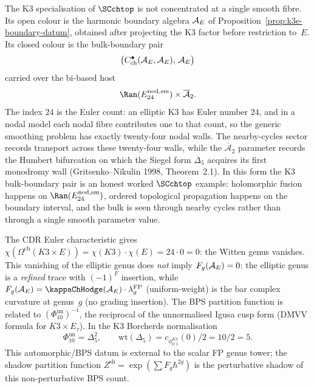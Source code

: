 \begin{example}
\label{ex:k3e-scchtop-bulk-boundary}
The K3 specialisation of $\SCchtop$ is not concentrated at a single
smooth fibre. Its open colour is the harmonic boundary algebra
$\mathcal{A}_E$ of Proposition~\ref{prop:k3e-boundary-datum}, obtained after
projecting the K3 factor before restriction to~$E$. Its closed colour
is the bulk-boundary pair
\[
 \bigl(C^\bullet_{\mathrm{ch}}(\mathcal{A}_E,\mathcal{A}_E),\, \mathcal{A}_E\bigr)
\]
carried over the bi-based host
\[
 \Ran(E^{\mathrm{nod,sm}}_{24}) \times \overline{\mathcal{A}}_2.
\]
The index $24$ is the Euler count: an elliptic K3 has Euler number
$24$, and in a nodal model each nodal fibre contributes one to that
count, so the generic smoothing problem has exactly twenty-four nodal
walls. The nearby-cycles sector records transport
across these twenty-four walls, while the $\overline{\mathcal{A}}_2$
parameter records the Humbert bifurcation on which the Siegel form
$\Delta_5$ acquires its first monodromy wall
\textup{(}Gritsenko--Nikulin 1998, Theorem~2.1\textup{)}. In this form
the K3 bulk-boundary pair is an honest worked $\SCchtop$ example:
holomorphic fusion happens on $\Ran(E^{\mathrm{nod,sm}}_{24})$, ordered
topological propagation happens on the boundary interval, and the bulk
is seen through nearby cycles rather than through a single smooth
parameter value.
\end{example}

\begin{remark}
\label{rem:k3e-factorization-homology}
The CDR Euler characteristic gives
$\chi(\Omega^{\mathrm{ch}}(K3 \times E)) = \chi(K3) \cdot \chi(E)
= 24 \cdot 0 = 0$: the Witten genus vanishes. This
vanishing of the elliptic genus does \emph{not} imply
$F_g(\mathcal{A}_E) = 0$: the elliptic genus is a
\emph{refined} trace with $(-1)^F$ insertion, while
$F_g(\cA_E) = \kappaChHodge(\cA_E) \cdot \lambda_g^{\mathrm{FP}}$
\textup{(}uniform-weight\textup{)} is the bar complex
curvature at genus~$g$ (no grading insertion). The BPS partition
function is related to $(\Phi_{10}^{\mathrm{un}})^{-1}$, the reciprocal
of the unnormalised Igusa cusp form (DMVV formula for
$K3 \times E_\tau$). In the K3 Borcherds normalisation
\[
 \Phi_{10}^{\mathrm{un}}=\Delta_5^2,\qquad
 \mathrm{wt}(\Delta_5)=c_{\phi_{0,1}^{K3}}(0)/2=10/2=5 .
\]
This automorphic/BPS datum is external to the scalar FP genus tower; the
shadow
partition function $Z^{\mathrm{sh}} = \exp(\sum F_g \hbar^{2g})$
is the perturbative shadow of this non-perturbative BPS count.
\end{remark}


